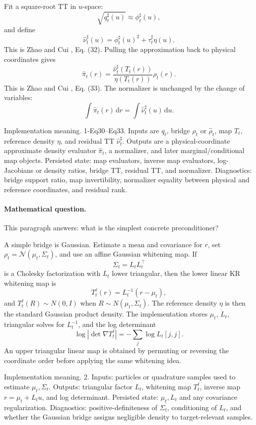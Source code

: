 \documentclass[11pt]{article}
\newcommand{\dd}{\,\mathrm d}
\begin{document}
Fit a square-root TT in \(u\)-space:
\[
    \sqrt{q^\sharp_t(u)}\approx \phi^\sharp_t(u),
\]
and define
\[
    \widehat\nu^\sharp_t(u)
    =
    \phi^\sharp_t(u)^2+\tau^\sharp_t\eta(u).
    \label{eq:p24-p3}
\]
This is Zhao and Cui \cite{zhao2024ttsequential}, Eq. (32).  Pulling the approximation back to physical
coordinates gives
\[
    \widehat\pi_t(r)
    =
    \frac{\widehat\nu^\sharp_t(T_t(r))}
    {\eta(T_t(r))}
    \rho_t(r).
    \label{eq:p24-p4}
\]
This is Zhao and Cui \cite{zhao2024ttsequential}, Eq. (33).  The normalizer is unchanged by the change of
variables:
\[
    \int \widehat\pi_t(r)\dd r
    =
    \int \widehat\nu^\sharp_t(u)\dd u.
    \label{eq:p24-p5}
\]

Implementation meaning. 1-Eq30--Eq33.  Inputs are \(q_t\), bridge
\(\rho_t\) or \(\widehat\rho_t\), map \(T_t\), reference density \(\eta\), and
residual TT \(\widehat\nu_t^\sharp\).  Outputs are a physical-coordinate
approximate density evaluator \(\widehat\pi_t\), a normalizer, and later
marginal/conditional map objects.  Persisted state: map evaluators, inverse map
evaluators, log-Jacobians or density ratios, bridge TT, residual TT, and
normalizer.  Diagnostics: bridge support ratio, map invertibility,
normalizer equality between physical and reference coordinates, and residual
rank.

\paragraph{Mathematical question.}
This paragraph answers: what is the simplest concrete preconditioner?

A simple bridge is Gaussian.  Estimate a mean and covariance for \(r\), set
\(\rho_t=\mathcal N(\mu_t,\Sigma_t)\), and use an affine Gaussian whitening map.
If
\[
    \Sigma_t=L_tL_t^\top
    \label{eq:p24-p6a}
\]
is a Cholesky factorization with \(L_t\) lower triangular, then the lower
linear KR whitening map is
\[
    T_t^{\ell}(r)
    =
    L_t^{-1}(r-\mu_t),
    \label{eq:p24-p6b}
\]
and \(T_t^{\ell}(R)\sim N(0,I)\) when \(R\sim N(\mu_t,\Sigma_t)\).  The
reference density \(\eta\) is then the standard Gaussian product density.  The
implementation stores \(\mu_t\), \(L_t\), triangular solves for \(L_t^{-1}\),
and the log determinant
\[
    \log|\det\nabla T_t^{\ell}|
    =
    -\sum_j\log L_t[j,j].
    \label{eq:p24-p6c}
\]
An upper triangular linear map is obtained by permuting or reversing the
coordinate order before applying the same whitening idea.

Implementation meaning. 2.  Inputs: particles or quadrature samples used
to estimate \(\mu_t,\Sigma_t\).  Outputs: triangular factor \(L_t\), whitening
map \(T_t^\ell\), inverse map \(r=\mu_t+L_tu\), and log determinant.  Persisted
state: \(\mu_t,L_t\) and any covariance regularization.  Diagnostics:
positive-definiteness of \(\Sigma_t\), conditioning of \(L_t\), and whether the
Gaussian bridge assigns negligible density to target-relevant samples.
\end{document}
